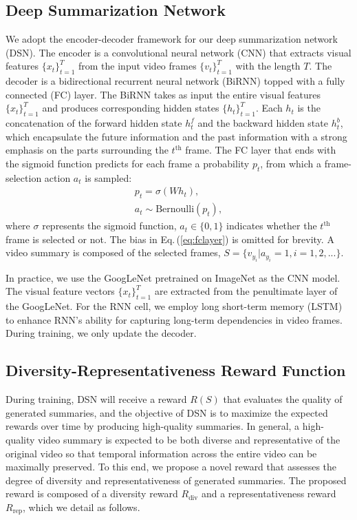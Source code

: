 \documentclass[letterpaper]{article} \usepackage{aaai18}  \usepackage{times}  \usepackage{helvet}  \usepackage{courier}  \usepackage{url}  \usepackage{graphicx}
\begin{document}
\subsection{Deep Summarization Network}
We adopt the encoder-decoder framework for our deep summarization network (DSN). The encoder is a convolutional neural network (CNN) that extracts visual features $\{ x_t \}_{t=1}^T$ from the input video frames $\{ v_t \}_{t=1}^T$ with the length $T$. The decoder is a bidirectional recurrent neural network (BiRNN) topped with a fully connected (FC) layer. The BiRNN takes as input the entire visual features $\{ x_t \}_{t=1}^T$ and produces corresponding hidden states $\{ h_t \}_{t=1}^T$. Each $h_t$ is the concatenation of the forward hidden state $h^f_t$ and the backward hidden state $h^b_t$, which encapsulate the future information and the past information with a strong emphasis on the parts surrounding the $t^{\text{th}}$ frame. The FC layer that ends with the sigmoid function predicts for each frame a probability $p_t$, from which a frame-selection action $a_t$ is sampled:
\begin{align}
p_t = \sigma (W h_t), \label{eq:fclayer} \\
a_t \sim \text{Bernoulli} (p_t),
\end{align}
where $\sigma$ represents the sigmoid function, $a_t \in \{ 0, 1 \}$ indicates whether the $t^{\text{th}}$ frame is selected or not. The bias in Eq.\,(\ref{eq:fclayer}) is omitted for brevity. A video summary is composed of the selected frames, $S = \{v_{y_i} | a_{y_i} = 1, i = 1, 2, ... \}$.

In practice, we use the GoogLeNet \cite{szegedy2015going} pretrained on ImageNet \cite{deng2009imagenet} as the CNN model. The visual feature vectors $\{ x_t \}_{t=1}^T$ are extracted from the penultimate layer of the GoogLeNet. For the RNN cell, we employ long short-term memory (LSTM) to enhance RNN's ability for capturing long-term dependencies in video frames. During training, we only update the decoder.

\subsection{Diversity-Representativeness Reward Function}
During training, DSN will receive a reward $R(S)$ that evaluates the quality of generated summaries, and the objective of DSN is to maximize the expected rewards over time by producing high-quality summaries. In general, a high-quality video summary is expected to be both diverse and representative of the original video so that temporal information across the entire video can be maximally preserved. To this end, we propose a novel reward that assesses the degree of diversity and representativeness of generated summaries. The proposed reward is composed of a diversity reward $R_\text{div}$ and a representativeness reward $R_\text{rep}$, which we detail as follows.
\end{document}

